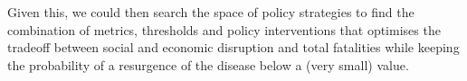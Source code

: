 \documentclass{article}
\begin{document}
Given this, we could then search the space of policy strategies to find the combination of metrics, thresholds and policy interventions that optimises the tradeoff between social and economic disruption and total fatalities while keeping the probability of a resurgence of the disease below a (very small) value.

%
% 


\end{document}
